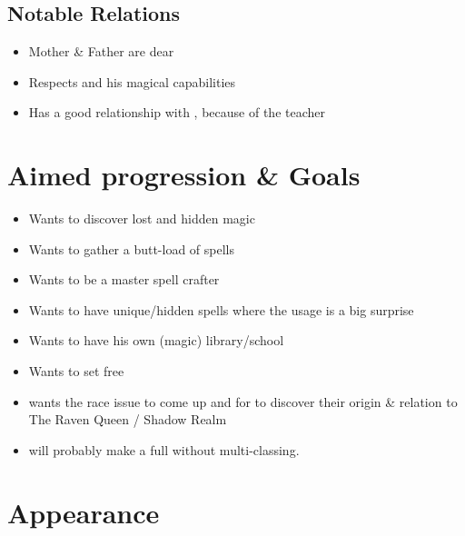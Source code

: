     \subsection{Notable Relations}
    \begin{itemize}
        \item Mother \& Father are dear
        \item Respects \Master{} and his magical capabilities
        \item Has a good relationship with \CloisterIntro{}, because of the teacher
    \end{itemize}

    \section{Aimed progression \& Goals}
    \begin{itemize}
        \item Wants to discover lost and hidden magic
        \item Wants to gather a butt-load of spells
        \item Wants to be a master spell crafter
        \item Wants to have unique/hidden spells where the usage is a big surprise
        \item Wants to have his own (magic) library/school
        \item Wants to set \Master{} free
        \item \bookauthor{} wants the race issue to come up and for \Name{} to discover their origin \& relation to The Raven Queen / Shadow Realm
        \item \bookauthor{} will probably make \Name{} a full \Class{} without multi-classing.
    \end{itemize}

    \section{Appearance}

\fi
